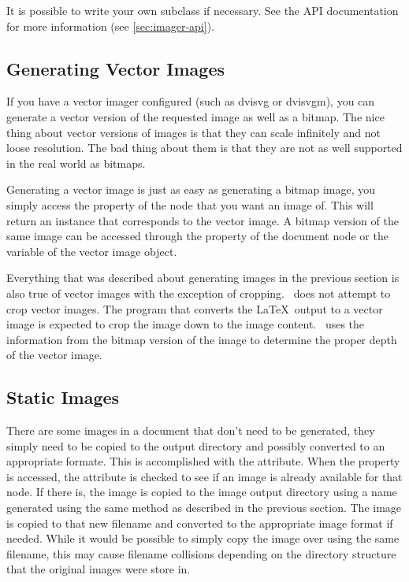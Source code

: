 It is possible to write your own  subclass if necessary.
See the  API documentation for more information (see
\ref{sec:imager-api}).


\subsection{Generating Vector Images}

If you have a vector imager configured (such as dvisvg or dvisvgm), you
can generate a vector version of the requested image as well as a 
bitmap.  The nice thing about vector versions of images is that they
can scale infinitely and not loose resolution.  The bad thing about them
is that they are not as well supported in the real world as bitmaps.

Generating a vector image is just as easy as generating a bitmap image,
you simply access the  property of the node that
you want an image of.  This will return an  
instance that corresponds to the vector image.  A bitmap version of 
the same image can be accessed through the  property of the
document node or the  variable of the vector image object.

Everything that was described about generating images in the previous 
section is also true of vector images with the exception of cropping.
\plasTeX\ does not attempt to crop vector images.  The program that
converts the \LaTeX\ output to a vector image is expected to crop the 
image down to the image content.  \plasTeX\ uses the information from
the bitmap version of the image to determine the proper depth of the 
vector image.


\subsection{Static Images}

There are some images in a document that don't need to be generated, they
simply need to be copied to the output directory and possibly converted
to an appropriate formate.  This is accomplished with the 
 attribute.  When the  property
is accessed, the  attribute is checked to see if
an image is already available for that node.  If there is, the image
is copied to the image output directory using a name generated 
using the same method as described in the previous section.  The image
is copied to that new filename and converted to the appropriate 
image format if needed.  While it would be possible to simply copy the
image over using the same filename, this may cause filename collisions
depending on the directory structure that the original images were
store in.

